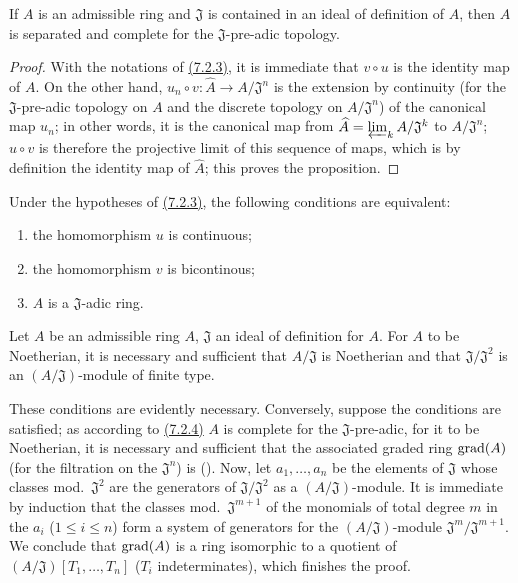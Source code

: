 \begin{prop}[7.2.4]
\label{0.7.2.4}
If $A$ is an admissible ring and $\mathfrak{J}$ is contained in an ideal of
definition of $A$, then $A$ is separated and complete for the
$\mathfrak{J}$-pre-adic topology.
\end{prop}

\begin{proof}
\label{proof-0.7.2.4}
With the notations of \hyperref[0.7.2.3]{(7.2.3)}, it is immediate that
$v\circ u$ is the identity map of $A$. On the other hand,
$u_n\circ v:\widehat{A}\to A/\mathfrak{J}^n$ is the extension by continuity (for
the $\mathfrak{J}$-pre-adic topology on $A$ and the discrete topology on
$A/\mathfrak{J}^n$) of the canonical map $u_n$; in other words, it is the
canonical map from $\widehat{A}=\varprojlim_k A/\mathfrak{J}^k$ to
$A/\mathfrak{J}^n$; $u\circ v$ is therefore the projective limit of this
sequence of maps, which is by definition the identity map of
$\widehat{A}$; this proves the proposition.
\end{proof}

\begin{cor}[7.2.5]
\label{0.7.2.5}
Under the hypotheses of \hyperref[0.7.2.3]{(7.2.3)}, the following conditions are
equivalent:
\begin{enumerate}[label={\rm(\alph*)}]
  \item the homomorphism $u$ is continuous;
  \item the homomorphism $v$ is bicontinous;
  \item $A$ is a $\mathfrak{J}$-adic ring.
\end{enumerate}
\end{cor}

\begin{cor}[7.2.6]
\label{0.7.2.6}
Let $A$ be an admissible ring $A$, $\mathfrak{J}$ an ideal of definition for
$A$. For $A$ to be Noetherian, it is necessary and sufficient that
$A/\mathfrak{J}$ is Noetherian and that $\mathfrak{J}/\mathfrak{J}^2$ is an
$(A/\mathfrak{J})$-module of finite type.
\end{cor}

These conditions are evidently necessary. Conversely, suppose the conditions
are satisfied; as according to \hyperref[0.7.2.4]{(7.2.4)} $A$ is complete for the
$\mathfrak{J}$-pre-adic, for it to be Noetherian, it is necessary and sufficient
that the associated graded ring ${\mathop{\mathrm{grad}}\nolimits}(A)$ (for the filtration on the
$\mathfrak{J}^n$) is (\cite[p~.18--07, th.~4]{I-1}). Now, let $a_1,\dots,a_n$ be
the elements of $\mathfrak{J}$ whose classes mod.~$\mathfrak{J}^2$ are the
generators of $\mathfrak{J}/\mathfrak{J}^2$ as a $(A/\mathfrak{J})$-module. It
is immediate by induction that the classes mod.~$\mathfrak{J}^{m+1}$ of the
monomials of total degree $m$ in the $a_i$ ($1\leqslant i\leqslant n$) form a
system of generators for the $(A/\mathfrak{J})$-module
$\mathfrak{J}^m/\mathfrak{J}^{m+1}$. We conclude that ${\mathop{\mathrm{grad}}\nolimits}(A)$ is a ring
isomorphic to a quotient of $(A/\mathfrak{J})[T_1,\dots,T_n]$ ($T_i$
indeterminates), which finishes the proof.

